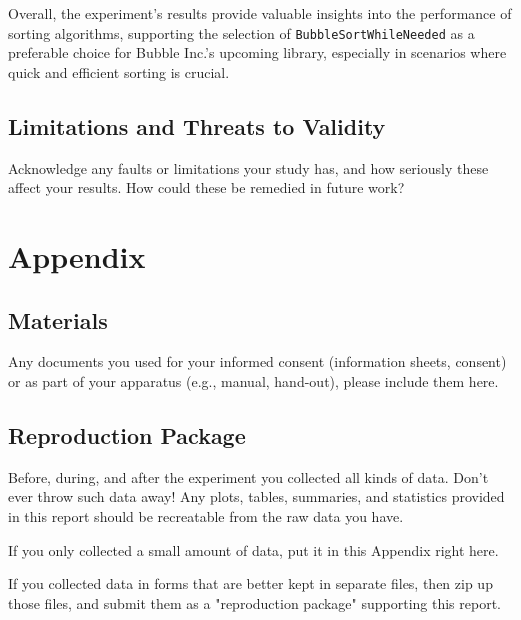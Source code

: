 \documentclass{article}
\begin{document}
\begin{tcolorbox}[title=Conclusion, colback=white, colframe=black, arc=0pt, outer arc=0pt]
    Overall, the experiment's results provide valuable insights into the performance of sorting algorithms, supporting the selection of \texttt{BubbleSortWhileNeeded} as a preferable choice for Bubble Inc.'s upcoming library, especially in scenarios where quick and efficient sorting is crucial.
\end{tcolorbox}


\subsection{Limitations and Threats to Validity}
Acknowledge any faults or limitations your study has, and how seriously these affect your
results. How could these be remedied in future work?

\section{Appendix}
\subsection{Materials}
Any documents you used for your informed consent (information sheets, consent) or as part of your apparatus (e.g., manual, hand-out), please include them here.

\subsection{Reproduction Package}
Before, during, and after the experiment you collected all kinds of data. Don't ever throw such data away! Any plots, tables, summaries, and statistics provided in this report should be recreatable from the raw data you have.

If you only collected a small amount of data, put it in this Appendix right here.

If you collected data in forms that are better kept in separate files, then zip up those files, and submit them as a "reproduction package" supporting this report.
\end{document}
